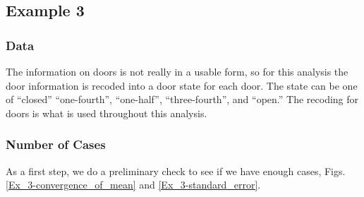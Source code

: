 \documentclass[12pt,twoside]{book}
\begin{document}
\subsection{Example 3}

\hypertarget{data}{%
\subsubsection{Data}\label{data}}

The information on doors is not really in a usable form, so for this analysis the door information is recoded into a door state for each door. The state can be one of ``closed'' ``one-fourth'', ``one-half'', ``three-fourth'', and ``open.'' The recoding for doors is what is used throughout this analysis.

\hypertarget{number-of-cases}{%
\subsubsection{Number of Cases}\label{number-of-cases}}

As a first step, we do a preliminary check to see if we have enough cases, Figs. \ref{Ex_3-convergence_of_mean} and \ref{Ex_3-standard_error}. 
\end{document}
